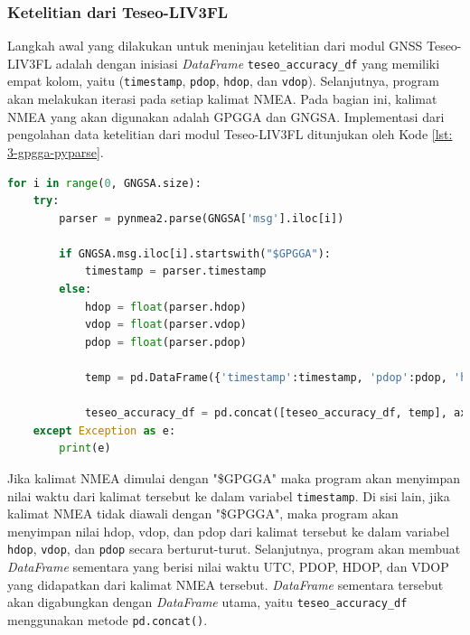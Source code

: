 \subsubsection{Ketelitian dari Teseo-LIV3FL}
Langkah awal yang dilakukan untuk meninjau ketelitian dari modul GNSS Teseo-LIV3FL adalah dengan inisiasi \textit{DataFrame} \texttt{teseo\_accuracy\_df} yang memiliki empat kolom, yaitu (\texttt{timestamp}, \texttt{pdop}, \texttt{hdop}, dan \texttt{vdop}). Selanjutnya, program akan melakukan iterasi pada setiap kalimat NMEA. Pada bagian ini, kalimat NMEA yang akan digunakan adalah GPGGA dan GNGSA. Implementasi dari pengolahan data ketelitian dari modul Teseo-LIV3FL ditunjukan oleh Kode \ref{lst: 3-gpgga-pyparse}.

\vspace{0.3cm}
\begin{lstlisting}[language=python, style=mystyle, caption={\textit{Parsing} Kalimat \$GPGGA pada Python}, label={lst: 3-gpgga-pyparse}]
for i in range(0, GNGSA.size):
	try:
		parser = pynmea2.parse(GNGSA['msg'].iloc[i])
		
		if GNGSA.msg.iloc[i].startswith("$GPGGA"):
			timestamp = parser.timestamp
		else:
			hdop = float(parser.hdop)
			vdop = float(parser.vdop)
			pdop = float(parser.pdop)
			
			temp = pd.DataFrame({'timestamp':timestamp, 'pdop':pdop, 'hdop':hdop, 'vdop':vdop}, index=[i])
			
			teseo_accuracy_df = pd.concat([teseo_accuracy_df, temp], axis=0)
	except Exception as e:
		print(e)
\end{lstlisting}

Jika kalimat NMEA dimulai dengan "\$GPGGA" maka program akan menyimpan nilai waktu dari kalimat tersebut ke dalam variabel \texttt{timestamp}. Di sisi lain, jika kalimat NMEA tidak diawali dengan "\$GPGGA", maka program akan menyimpan nilai hdop, vdop, dan pdop dari kalimat tersebut ke dalam variabel \texttt{hdop}, \texttt{vdop}, dan \texttt{pdop} secara berturut-turut. Selanjutnya, program akan membuat \textit{DataFrame} sementara yang berisi nilai waktu UTC, PDOP, HDOP, dan VDOP yang didapatkan dari kalimat NMEA tersebut. \textit{DataFrame} sementara tersebut akan digabungkan dengan \textit{DataFrame} utama, yaitu \texttt{teseo\_accuracy\_df} menggunakan metode \texttt{pd.concat()}.

